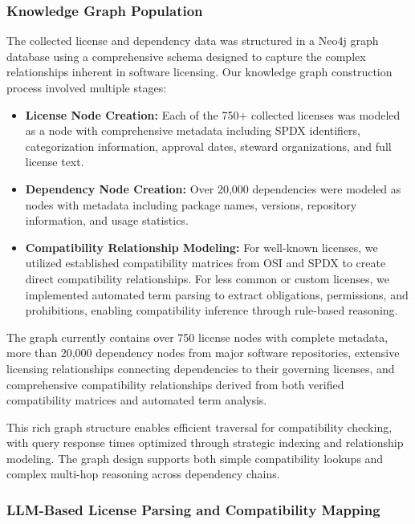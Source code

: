\subsubsection{Knowledge Graph Population}
The collected license and dependency data was structured in a Neo4j graph database using a comprehensive schema designed to capture the complex relationships inherent in software licensing. Our knowledge graph construction process involved multiple stages:

\begin{itemize}
    \item \textbf{License Node Creation:} Each of the 750+ collected licenses was modeled as a node with comprehensive metadata including SPDX identifiers, categorization information, approval dates, steward organizations, and full license text.
    \item \textbf{Dependency Node Creation:} Over 20,000 dependencies were modeled as nodes with metadata including package names, versions, repository information, and usage statistics.
    \item \textbf{Compatibility Relationship Modeling:} For well-known licenses, we utilized established compatibility matrices from OSI and SPDX to create direct compatibility relationships. For less common or custom licenses, we implemented automated term parsing to extract obligations, permissions, and prohibitions, enabling compatibility inference through rule-based reasoning.
\end{itemize}

The graph currently contains over 750 license nodes with complete metadata, more than 20,000 dependency nodes from major software repositories, extensive licensing relationships connecting dependencies to their governing licenses, and comprehensive compatibility relationships derived from both verified compatibility matrices and automated term analysis.

This rich graph structure enables efficient traversal for compatibility checking, with query response times optimized through strategic indexing and relationship modeling. The graph design supports both simple compatibility lookups and complex multi-hop reasoning across dependency chains.

\subsubsection{LLM-Based License Parsing and Compatibility Mapping}
\label{sec:llm_license_parsing}

